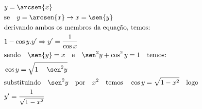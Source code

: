 \begin{ex}
\begin{align}
&y=\arcsen{x}\nonumber\\
&\text{se}\quad y=\arcsen{x}\rightarrow x=\sen{y}\nonumber\\
&\text{derivando ambos os membros da equação, temos:}\nonumber\\
&1-\cos{y}.y' \Rightarrow y'=\frac{1}{\cos{x}}\nonumber\\
&\text{sendo}\quad \sen{y}=x\quad \text{e}\quad \sen^2{y}+\cos^2{y}=1 \quad \text{temos:}\nonumber\\
&\cos{y} = \sqrt{1-\sen^2{y}}\nonumber\\
&\text{substituindo} \quad \sen^2{y}\quad\text{por}\quad x^2\quad\text{temos}\quad \cos{y}=\sqrt{1-x^2}\quad\text{logo}\nonumber\\
&y'=\frac{1}{\sqrt{1-x^2}}\nonumber
\end{align}
\end{ex}
